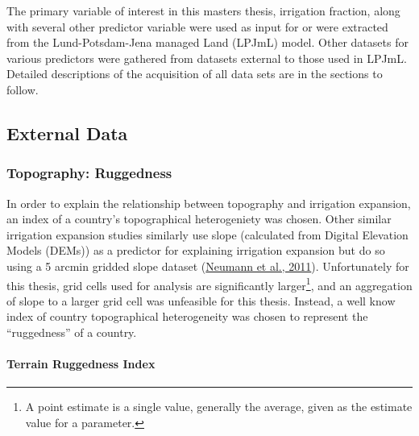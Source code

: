 \documentclass[12pt,twoside]{reedthesis}
\begin{document}
The primary variable of interest in this masters thesis, irrigation fraction, along with several other predictor variable were used as input for or were extracted from the Lund-Potsdam-Jena managed Land (LPJmL) model. Other datasets for various predictors were gathered from datasets external to those used in LPJmL. Detailed descriptions of the acquisition of all data sets are in the sections to follow.

\hypertarget{external-data}{%
\subsection{External Data}\label{external-data}}

\hypertarget{rugged}{%
\subsubsection{Topography: Ruggedness}\label{rugged}}

In order to explain the relationship between topography and irrigation expansion, an index of a country's topographical heterogeniety was chosen. Other similar irrigation expansion studies similarly use slope (calculated from Digital Elevation Models (DEMs)) as a predictor for explaining irrigation expansion but do so using a 5 arcmin gridded slope dataset (\protect\hyperlink{ref-neumannExploringGlobalIrrigation2011}{Neumann et al., 2011}). Unfortunately for this thesis, grid cells used for analysis are significantly larger\footnote{A point estimate is a single value, generally the average, given as the estimate value for a parameter.}, and an aggregation of slope to a larger grid cell was unfeasible for this thesis. Instead, a well know index of country topographical heterogeneity was chosen to represent the ``ruggedness'' of a country.

\hypertarget{TRI}{%
\paragraph{Terrain Ruggedness Index}\label{TRI}}
\end{document}
